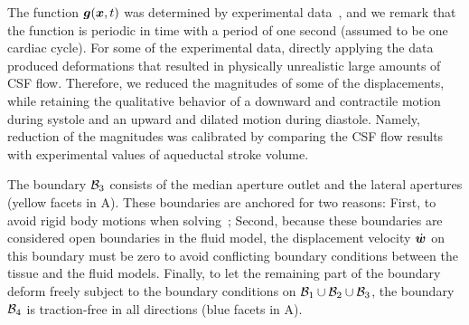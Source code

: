 \documentclass{template}
\begin{document}
The function $\bm{g}(\bm{x}, t)$ was determined by experimental
data~\citep{Kurtcuoglu2007ComputationalSylvius,
Enzmann1992BrainImaging, soellinger20093d, soellinger2007assessment,
greitz1992pulsatile, almudayni2023magnetic, pahlavian2018regional},
and we remark that the function is periodic in time with a period of
one second (assumed to be one cardiac cycle).
For some of the experimental data, directly applying the data produced
deformations that resulted in physically unrealistic large amounts of CSF flow.
Therefore, we reduced the magnitudes of some of the displacements,
while retaining the qualitative behavior
of a downward and contractile motion during systole and an upward
and dilated motion during diastole. Namely, reduction of the magnitudes was 
calibrated by comparing the CSF flow results with experimental values
of aqueductal stroke volume\citep{eide2021direction, wagshul2011pulsating}. 

The boundary $\mathcal{B}_3$ consists of the median aperture outlet
and the lateral apertures (yellow facets in A).
These boundaries are anchored for two reasons:
First, to avoid rigid body motions when solving~;
Second, because these boundaries are
considered open boundaries in the fluid model, the displacement velocity
$\dot{\bm{w}}$ on this boundary must be zero to avoid conflicting boundary conditions
between the tissue and the fluid models.
Finally, to let the remaining part of the boundary deform freely subject to the boundary conditions
on $\mathcal{B}_1\cup\mathcal{B}_2\cup\mathcal{B}_3$, the boundary $\mathcal{B}_4$ is traction-free in all directions
(blue facets in A).
\end{document}
